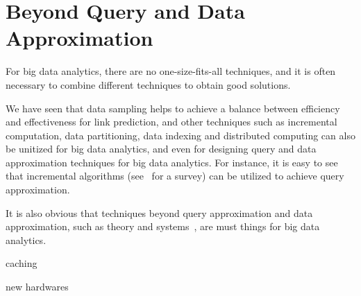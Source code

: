 \section{Beyond Query and Data Approximation}
\label{sec-beyond}

  For big data analytics, there are no one-size-fits-all techniques, and it is often necessary to combine different techniques to obtain good solutions.


We have seen that data sampling helps to achieve a balance between efficiency and effectiveness for link prediction,
and other techniques such as incremental computation, data partitioning, data indexing and distributed computing can
also be unitized for big data analytics, and even for designing query and data approximation techniques for big data analytics.
For instance, it is easy to see that incremental algorithms (see~\cite{Reps96} for a survey) can be utilized to achieve query approximation.

It is also obvious that techniques beyond query approximation and data approximation, such as theory and systems~\cite{FanGN13,Jordan15,ZahariaXWDADMRV16}, are must things for big data analytics.

caching

new hardwares